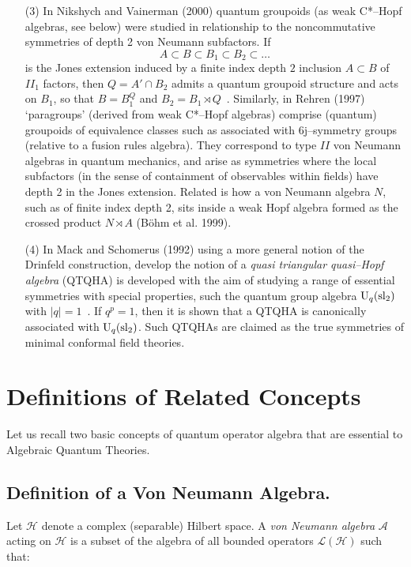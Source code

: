 \documentclass[12pt]{article}
\theoremstyle{plain}
\theoremstyle{definition}
\numberwithin{equation}{section}
\newcommand{\U}{{\rm U}}
\newcommand{\A}{\mathcal A}
\renewcommand{\H}{\mathcal H}
\renewcommand{\cL}{\mathcal L}
\newcommand{\med}{\medbreak}
\begin{document}
\begin{itemize}
\med
\item[(3)]
In Nikshych and Vainerman (2000) quantum groupoids (as weak
C*--Hopf algebras, see below) were studied in relationship to the
noncommutative symmetries of depth 2 von Neumann subfactors. If
\begin{equation}
A \subset B \subset B_1 \subset B_2 \subset \ldots
\end{equation}
is the Jones extension induced by a finite index depth $2$
inclusion $A \subset B$ of $II_1$ factors, then $Q= A' \cap B_2$
admits a quantum groupoid structure and acts on $B_1$, so that $B
= B_1^{Q}$ and $B_2 = B_1 \rtimes Q$~. Similarly, in Rehren (1997)
`paragroups' (derived from weak C*--Hopf algebras) comprise
(quantum) groupoids of equivalence classes such as associated with
6j--symmetry groups (relative to a fusion rules algebra). They
correspond to type $II$ von Neumann algebras in quantum mechanics,
and arise as symmetries where the local subfactors (in the sense
of containment of observables within fields) have depth 2 in the
Jones extension. Related is how a von Neumann algebra $N$, such as
of finite index depth 2, sits inside a weak Hopf algebra formed as
the crossed product $N \rtimes A$ (B\"ohm et al. 1999).

\med
\item[(4)]
In Mack and Schomerus (1992) using a more general notion of the
Drinfeld construction, develop the notion of a \emph{quasi
triangular quasi--Hopf algebra} (QTQHA) is developed with the aim
of studying a range of essential symmetries with special
properties, such the quantum group algebra $\U_q (\rm{sl}_2)$ with
$\vert q \vert =1$~. If $q^p=1$, then it is shown that a QTQHA is
canonically associated with $\U_q (\rm{sl}_2)$. Such QTQHAs are
claimed as the true symmetries of minimal conformal field
theories.
\end{itemize}


\section{Definitions of Related Concepts}
Let us recall two basic concepts of quantum operator algebra that are essential to Algebraic Quantum Theories. \\

\subsection {Definition of a Von Neumann Algebra.}
\med
Let $\H$ denote a complex (separable) Hilbert space. A \emph{von
Neumann algebra} $\A$ acting on $\H$ is a subset of the algebra of
all bounded operators $\cL(\H)$ such that:
\end{document}
